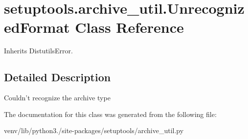\hypertarget{classsetuptools_1_1archive__util_1_1_unrecognized_format}{}\section{setuptools.\+archive\+\_\+util.\+Unrecognized\+Format Class Reference}
\label{classsetuptools_1_1archive__util_1_1_unrecognized_format}


Inherits Distutils\+Error.



\subsection{Detailed Description}
\begin{DoxyVerb}Couldn't recognize the archive type\end{DoxyVerb}
 

The documentation for this class was generated from the following file\+:\begin{DoxyCompactItemize}
\item 
venv/lib/python3./site-\/packages/setuptools/archive\+\_\+util.\+py\end{DoxyCompactItemize}
